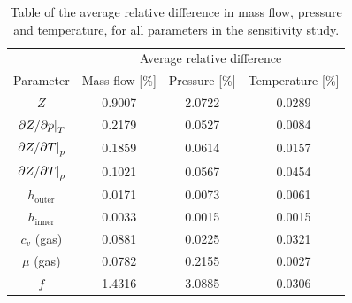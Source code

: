 \begin{table}[!hb]
    \caption{
        Table of the average relative difference in mass flow, pressure and temperature, for all parameters in the sensitivity study.  %
        \label{tab:averageImpact} %
    } %
    \centering %
    \begin{tabular}{cccc} %
        \toprule
        & \multicolumn{3}{c}{Average relative difference} \\ \cmidrule(r){2-4}
        \parbox{2.5cm}{\centering Parameter} & Mass flow [\si{\percent}] & Pressure [\si{\percent}] & Temperature [\si{\percent}] \\
        \midrule
        $Z$ & 0.9007 & 2.0722 & 0.0289 \\
        $\eval{\partial Z/\partial p}_T$ & 0.2179 & 0.0527 & 0.0084 \\
        $\eval{\partial Z/\partial T}_p$ & 0.1859 & 0.0614 & 0.0157 \\
        $\eval{\partial Z/\partial T}_\rho$ & 0.1021 & 0.0567 & 0.0454 \\
        $h_\mathrm{outer}$ & 0.0171 & 0.0073 & 0.0061 \\
        $h_\mathrm{inner}$ & 0.0033 & 0.0015 & 0.0015 \\
        $c_v$ (gas) & 0.0881 & 0.0225 & 0.0321 \\
        $\mu$ (gas) & 0.0782 & 0.2155 & 0.0027 \\
        $f$ & 1.4316 & 3.0885 & 0.0306 \\
        \bottomrule
    \end{tabular}
\end{table}

